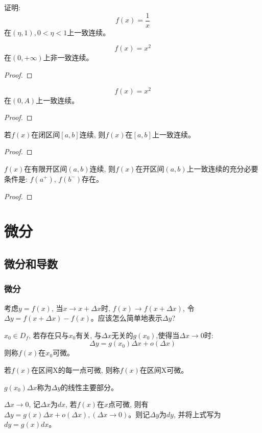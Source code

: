 \documentclass[lang=cn]{elegantbook}
\begin{document}
\begin{proposition}
    证明:
    \[  f(x) = \frac{1}{x} \]
    在$(\eta, 1), 0 < \eta < 1$上一致连续。
\end{proposition}

\begin{proposition}
    \[ f(x) = x^2 \]
    在$(0, +\infty)$上非一致连续。
\end{proposition}
\begin{proof}
    
\end{proof}

\begin{proposition}
    \[ f(x) = x^2 \]
    在$(0, A)$上一致连续。
\end{proposition}
\begin{proof}
    
\end{proof}

\begin{theorem}[Cantor定理]
    若$f(x)$在闭区间$[a, b]$连续, 则$f(x)$在$[a, b]$上一致连续。
\end{theorem}
\begin{proof}
    
\end{proof}

\begin{theorem}
    $f(x)$在有限开区间$(a, b)$连续, 则$f(x)$在开区间$(a,b)$上一致连续的充分必要条件是: $f(a^+)$, $f(b^-)$存在。
\end{theorem}
\begin{proof}
    
\end{proof}

\chapter{微分}
\section{微分和导数}
\subsection{微分}
考虑$y = f(x)$, 当$x \to x + \Delta x$时, $f(x) \to f(x+\Delta x)$, 令$\Delta y = f(x+\Delta x) - f(x)$。应该怎么简单地表示$\Delta y$?
\begin{definition}[微分的定义]
    $x_0 \in D_f$, 若存在只与$x_0$有关, 与$\Delta x$无关的$g(x_0)$,使得当$\Delta x \to 0$时:
    \[ \Delta y = g(x_0)\Delta x + o(\Delta x) \]
    则称$f(x)$在$x_0$可微。

    若$f(x)$在区间X的每一点可微, 则称$f(x)$在区间X可微。

    $g(x_0)\Delta x$称为$\Delta y$的线性主要部分。

    $\Delta x \to 0$, 记$\Delta x$为$dx$, 若$f(x)$在$x$点可微, 则有$\Delta y = g(x)\Delta x + o(\Delta x), (\Delta x \to 0)$。则记$\Delta y$为$dy$, 并将上式写为$dy = g(x)dx $。
\end{definition}
\end{document}
